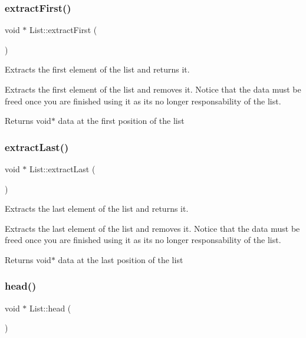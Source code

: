 \subsubsection{\texorpdfstring{extract\+First()}{extractFirst()}}
{\footnotesize\ttfamily void $\ast$ List\+::extract\+First (\begin{DoxyParamCaption}{ }\end{DoxyParamCaption})}



Extracts the first element of the list and returns it. 

Extracts the first element of the list and removes it. Notice that the data must be freed once you are finished using it as it\textquotesingle{}s no longer responsability of the list.

\begin{DoxyReturn}{Returns}
void$\ast$ data at the first position of the list 
\end{DoxyReturn}
\mbox{\label{class_list_ac9bda885e56890a73be49ed5f174fd93}} 
\subsubsection{\texorpdfstring{extract\+Last()}{extractLast()}}
{\footnotesize\ttfamily void $\ast$ List\+::extract\+Last (\begin{DoxyParamCaption}{ }\end{DoxyParamCaption})}



Extracts the last element of the list and returns it. 

Extracts the last element of the list and removes it. Notice that the data must be freed once you are finished using it as it\textquotesingle{}s no longer responsability of the list.

\begin{DoxyReturn}{Returns}
void$\ast$ data at the last position of the list 
\end{DoxyReturn}
\mbox{\label{class_list_a45822c272703eb83f6a9519c1515a736}} 
\subsubsection{\texorpdfstring{head()}{head()}}
{\footnotesize\ttfamily void $\ast$ List\+::head (\begin{DoxyParamCaption}{ }\end{DoxyParamCaption})}



